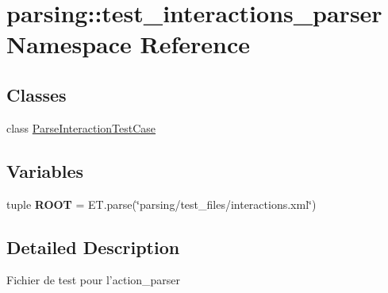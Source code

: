 \hypertarget{namespaceparsing_1_1test__interactions__parser}{\section{parsing\-:\-:test\-\_\-interactions\-\_\-parser \-Namespace \-Reference}
\label{namespaceparsing_1_1test__interactions__parser}
}
\subsection*{\-Classes}
\begin{DoxyCompactItemize}
\item 
class \hyperlink{classparsing_1_1test__interactions__parser_1_1_parse_interaction_test_case}{\-Parse\-Interaction\-Test\-Case}
\end{DoxyCompactItemize}
\subsection*{\-Variables}
\begin{DoxyCompactItemize}
\item 
\hypertarget{namespaceparsing_1_1test__interactions__parser_a1114f4209ddc39fef83eb46bdc6dcead}{tuple {\bfseries \-R\-O\-O\-T} = \-E\-T.\-parse(\char`\"{}parsing/test\-\_\-files/interactions.\-xml\char`\"{})}\label{namespaceparsing_1_1test__interactions__parser_a1114f4209ddc39fef83eb46bdc6dcead}

\end{DoxyCompactItemize}


\subsection{\-Detailed \-Description}
\begin{DoxyVerb}
Fichier de test pour l'action_parser
\end{DoxyVerb}
 